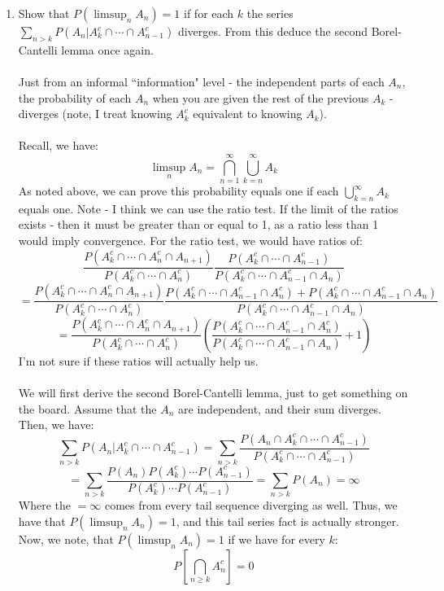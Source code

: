 \documentclass[12pt,a4paper]{article}
\newcommand{\1}[1]{\mathbbm{1}\left\{ #1 \right\}}
\begin{document}
\begin{enumerate}
	\item Show that $P(\limsup_n A_n) = 1$ if for each $k$ the series $\sum_{n > k} P(A_n | A_k^c \cap \cdots \cap A_{n-1}^c)$ diverges. From this deduce the second Borel-Cantelli lemma once again.
	\\\\
	Just from an informal ``information" level - the independent parts of each $A_n$, the probability of each $A_n$ when you are given the rest of the previous $A_k$ - diverges (note, I treat knowing $A_k^c$ equivalent to knowing $A_k$).
	\\\\
	Recall, we have:
	$$
		\limsup_n A_n = \bigcap_{n=1}^\infty \bigcup_{k=n}^\infty A_k
	$$
	As noted above, we can prove this probability equals one if each $\bigcup_{k=n}^\infty A_k$ equals one. Note - I think we can use the ratio test. If the limit of the ratios exists - then it must be greater than or equal to 1, as a ratio less than 1 would imply convergence. For the ratio test, we would have ratios of:
	$$
		\frac{P(A_k^c \cap \cdots \cap A_n^c \cap A_{n+1})}{P(A_k^c \cap \cdots \cap A_n^c)}
		\frac{P(A_k^c \cap \cdots \cap A_{n-1}^c)}{P(A_k^c \cap \cdots \cap A_{n-1}^c \cap A_n)}
	$$
	$$
		=
		\frac{P(A_k^c \cap \cdots \cap A_n^c \cap A_{n+1})}{P(A_k^c \cap \cdots \cap A_n^c)}
		\frac{P(A_k^c \cap \cdots \cap A_{n-1}^c \cap A_n^c) + P(A_k^c \cap \cdots \cap A_{n-1}^c \cap A_n)}{P(A_k^c \cap \cdots \cap A_{n-1}^c \cap A_n)}
	$$
	$$
		=
		\frac{P(A_k^c \cap \cdots \cap A_n^c \cap A_{n+1})}{P(A_k^c \cap \cdots \cap A_n^c)}
		\left(
		\frac{P(A_k^c \cap \cdots \cap A_{n-1}^c \cap A_n^c)}{P(A_k^c \cap \cdots \cap A_{n-1}^c \cap A_n)} + 1
		\right)
	$$
	I'm not sure if these ratios will actually help us.
	\\\\
	We will first derive the second Borel-Cantelli lemma, just to get something on the board. Assume that the $A_n$ are independent, and their sum diverges. Then, we have:
	$$
		\sum_{n > k} P(A_n | A_k^c \cap \cdots \cap A_{n-1}^c) = 
		\sum_{n > k} \frac{P(A_n \cap A_k^c \cap \cdots \cap A_{n-1}^c)}{P(A_k^c \cap \cdots \cap A_{n-1}^c)}
	$$
	$$
		=
		\sum_{n > k} \frac{P(A_n) P(A_k^c) \cdots P(A_{n-1}^c)}{P(A_k^c) \cdots P(A_{n-1}^c)} =
		\sum_{n > k} P(A_n) = \infty
	$$
	Where the $= \infty$ comes from every tail sequence diverging as well. Thus, we have that $P(\limsup_n A_n) = 1$, and this tail series fact is actually stronger. Now, we note, that $P(\limsup_n A_n) = 1$ if we have for every $k$:
	$$
		P\left[\bigcap_{n \geq k} A_n^c\right] = 0
$$
\end{enumerate}
\end{document}
